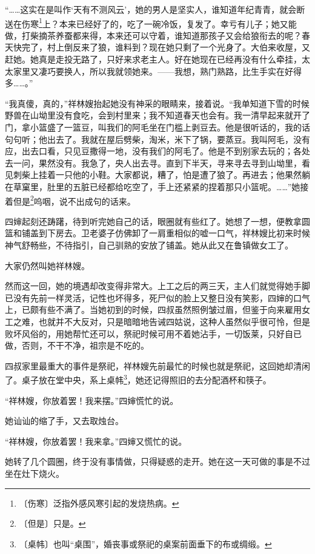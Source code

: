 \documentclass[12pt,UTF-8,openany]{ctexbook}
\begin{document}
\begin{large}
    “……这实在是叫作‘天有不测风云’，她的男人是坚实人，谁知道年纪青青，就会断送在伤寒\footnote{〔伤寒〕泛指外感风寒引起的发烧热病。}上？本来已经好了的，吃了一碗冷饭，复发了。幸亏有儿子；她又能做，打柴摘茶养蚕都来得，本来还可以守着，谁知道那孩子又会给狼衔去的呢？春天快完了，村上倒反来了狼，谁料到？现在她只剩了一个光身了。大伯来收屋，又赶她。她真是走投无路了，只好来求老主人。好在她现在已经再没有什么牵挂，太太家里又凄巧要换人，所以我就领她来。——我想，熟门熟路，比生手实在好得多……。”
    
    “我真傻，真的，”祥林嫂抬起她没有神采的眼睛来，接着说。“我单知道下雪的时候野兽在山坳里没有食吃，会到村里来；我不知道春天也会有。我一清早起来就开了门，拿小篮盛了一篮豆，叫我们的阿毛坐在门槛上剥豆去。他是很听话的，我的话句句听；他出去了。我就在屋后劈柴，淘米，米下了锅，要蒸豆。我叫阿毛，没有应，出去口看，只见豆撒得一地，没有我们的阿毛了。他是不到别家去玩的；各处去一问，果然没有。我急了，央人出去寻。直到下半天，寻来寻去寻到山坳里，看见刺柴上挂着一只他的小鞋。大家都说，糟了，怕是遭了狼了。再进去；他果然躺在草窠里，肚里的五脏已经都给吃空了，手上还紧紧的捏着那只小篮呢。……”她接着但是\footnote{〔但是〕只是。}呜咽，说不出成句的话来。
    
    四婶起刻还踌躇，待到听完她自己的话，眼圈就有些红了。她想了一想，便教拿圆篮和铺盖到下房去。卫老婆子仿佛卸了一肩重相似的嘘一口气，祥林嫂比初来时候神气舒畅些，不待指引，自己驯熟的安放了铺盖。她从此又在鲁镇做女工了。
    
    大家仍然叫她祥林嫂。
    
    然而这一回，她的境遇却改变得非常大。上工之后的两三天，主人们就觉得她手脚已没有先前一样灵活，记性也坏得多，死尸似的脸上又整日没有笑影，四婶的口气上，已颇有些不满了。当她初到的时候，四叔虽然照例皱过眉，但鉴于向来雇用女工之难，也就并不大反对，只是暗暗地告诫四姑说，这种人虽然似乎很可怜，但是败坏风俗的，用她帮忙还可以，祭祀时候可用不着她沾手，一切饭莱，只好自已做，否则，不干不净，祖宗是不吃的。
    
    四叔家里最重大的事件是祭祀，祥林嫂先前最忙的时候也就是祭祀，这回她却清闲了。桌子放在堂中央，系上桌帏\footnote{〔桌帏〕也叫“桌围”，婚丧事或祭祀的桌案前面垂下的布或绸缎。}，她还记得照旧的去分配酒杯和筷子。
    
    “祥林嫂，你放着罢！我来摆。”四婶慌忙的说。
    
    她讪讪的缩了手，又去取烛台。
    
    “祥林嫂，你放着罢！我来拿。”四婶又慌忙的说。
    
    她转了几个圆圈，终于没有事情做，只得疑惑的走开。她在这一天可做的事是不过坐在灶下烧火。
    

\end{large}
\end{document}
